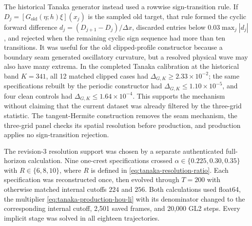 \documentclass[11pt]{article}
\begin{document}
The historical Tanaka generator instead used a rowwise sign-transition rule.
If
$D_j=[G_{\mathrm{old}}(\eta;h)\xi](x_j)$ is the sampled old target, that rule
formed the cyclic forward difference
$d_j=(D_{j+1}-D_j)/\Delta x$, discarded entries below
$0.03\max_j|d_j|$, and rejected when the remaining cyclic sign sequence had
more than ten transitions.  It was useful for the old clipped-profile
constructor because a boundary seam generated oscillatory curvature, but a
resolved physical wave may also have many extrema.  In the completed Tanaka
calibration at the historical band $K=341$, all 12 matched clipped cases had
$\Delta_{G,K}\geq2.33\times10^{-2}$; the same specifications rebuilt by the
periodic constructor had $\Delta_{G,K}\leq1.10\times10^{-5}$, and four clean
controls had $\Delta_{G,K}\leq1.64\times10^{-4}$.  This supports the mechanism
without claiming that the current dataset was already filtered by the
three-grid statistic.  The tangent-Hermite construction removes the seam
mechanism, the three-grid panel checks its spatial resolution before
production, and production applies no sign-transition rejection.

The revision-3 resolution support was chosen by a separate authenticated
full-horizon calculation.  Nine one-crest specifications crossed
$\alpha\in\{0.225,0.30,0.35\}$ with
$R\in\{6,8,10\}$, where $R$ is defined in
\eqref{eq:tanaka-resolution-ratio}.  Each specification was reconstructed
once, then evolved through $T=200$ with otherwise matched internal cutoffs
$224$ and $256$.  Both calculations used float64, the multiplier
\eqref{eq:tanaka-production-hou-li} with its denominator changed to the
corresponding internal cutoff, 2,501 saved frames, and 20,000 GL2 steps.  Every
implicit stage was solved in all eighteen trajectories.
\end{document}
